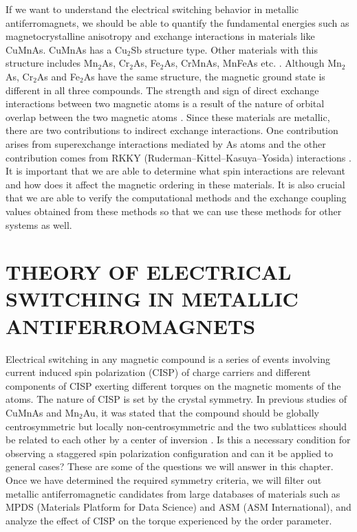 \documentclass[10pt,doublespacing,edeposit]{uiucthesis2020}
\begin{document}
\begin{mainmatter}
If we want to understand the electrical switching behavior in metallic antiferromagnets, we should be able to quantify the fundamental energies such as magnetocrystalline anisotropy and exchange interactions in materials like CuMnAs. CuMnAs has a Cu$_2$Sb structure type. Other materials with this structure includes Mn$_2$As, Cr$_2$As, Fe$_2$As, CrMnAs, MnFeAs etc. \cite{Lutz-Kappelman2018,Zhang2013,Zhang2015}. Although Mn$_2$As, Cr$_2$As and Fe$_2$As have the same structure, the magnetic ground state is different in all three compounds. The strength and sign of direct exchange interactions between two magnetic atoms is a result of the nature of orbital overlap between the two magnetic atoms \cite{Zhang2013}. Since these materials are metallic, there are two contributions to indirect exchange interactions. One contribution arises from superexchange interactions mediated by As atoms and the other contribution comes from RKKY (Ruderman–Kittel–Kasuya–Yosida) interactions \cite{Zhang2015}. It is important that we are able to determine what spin interactions are relevant and how does it affect the magnetic ordering in these materials. It is also crucial that we are able to verify the computational methods and the exchange coupling values obtained from these methods so that we can use these methods for other systems as well.

\chapter{THEORY OF ELECTRICAL SWITCHING IN METALLIC ANTIFERROMAGNETS}

\vspace{10mm}


Electrical switching in any magnetic compound is a series of events involving current induced spin polarization (CISP) of charge carriers and different components of CISP exerting different torques on the magnetic moments of the atoms. The nature of CISP is set by the crystal symmetry. In previous studies of CuMnAs and Mn$_2$Au, it was stated that the compound should be globally centrosymmetric but locally non-centrosymmetric and the two sublattices should be related to each other by a center of inversion \cite{Zelezny2014,Zelezny2017,Wadley2016}. Is this a necessary condition for observing a staggered spin polarization configuration and can it be applied to general cases? These are some of the questions we will answer in this chapter. Once we have determined the required symmetry criteria, we will filter out metallic antiferromagnetic candidates from large databases of materials such as MPDS (Materials Platform for Data Science) and ASM (ASM International), and analyze the effect of CISP on the torque experienced by the order parameter.


\end{mainmatter}
\end{document}

